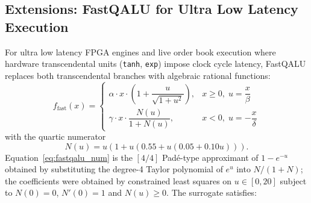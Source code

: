 \documentclass[conference]{IEEEtran}
\begin{document}
\subsection{Extensions: FastQALU for Ultra Low Latency Execution}
For ultra low latency FPGA engines and live order book execution where hardware transcendental units (\texttt{tanh}, \texttt{exp}) impose clock cycle latency, FastQALU replaces both transcendental branches with algebraic rational functions:
\begin{equation}
f_{\text{fast}}(x) = \begin{cases}
\alpha \cdot x \cdot \left(1 + \dfrac{u}{\sqrt{1 + u^2}}\right), & x \ge 0,\; u = \dfrac{x}{\beta} \\[2ex]
\gamma \cdot x \cdot \dfrac{N(u)}{1 + N(u)}, & x < 0,\; u = -\dfrac{x}{\delta}
\end{cases}
\label{eq:fastqalu}
\end{equation}
with the quartic numerator
\begin{equation}
N(u) = u\left(1 + u\left(0.55 + u\left(0.05 + 0.10u\right)\right)\right).
\label{eq:fastqalu_num}
\end{equation}
Equation~\eqref{eq:fastqalu_num} is the $[4/4]$ Pad\'e-type approximant of $1 - e^{-u}$ obtained by substituting the degree-4 Taylor polynomial of $e^{u}$ into $N/(1+N)$; the coefficients were obtained by constrained least squares on $u \in [0, 20]$ subject to $N(0)=0$, $N'(0)=1$ and $N(u) \ge 0$. The surrogate satisfies:
\end{document}
